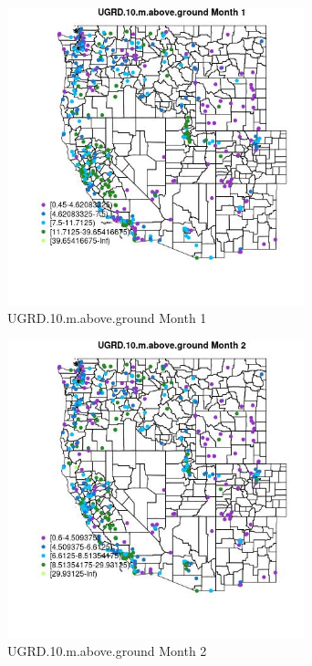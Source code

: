\begin{figure} 
\centering  
\includegraphics[width=0.77\textwidth]{Code_Outputs/ML_input_report_ML_input_PM25_Step5_part_d_de_duplicated_aves_ML_input_MapObsMo1UGRD10maboveground.jpg} 
\caption{\label{fig:ML_input_report_ML_input_PM25_Step5_part_d_de_duplicated_aves_ML_inputMapObsMo1UGRD10maboveground}UGRD.10.m.above.ground Month 1} 
\end{figure} 
 

\begin{figure} 
\centering  
\includegraphics[width=0.77\textwidth]{Code_Outputs/ML_input_report_ML_input_PM25_Step5_part_d_de_duplicated_aves_ML_input_MapObsMo2UGRD10maboveground.jpg} 
\caption{\label{fig:ML_input_report_ML_input_PM25_Step5_part_d_de_duplicated_aves_ML_inputMapObsMo2UGRD10maboveground}UGRD.10.m.above.ground Month 2} 
\end{figure} 
 

